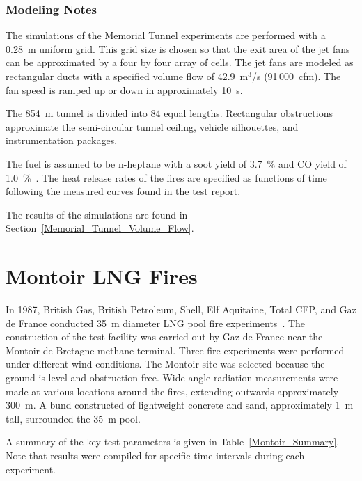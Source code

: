 \subsubsection{Modeling Notes}

The simulations of the Memorial Tunnel experiments are performed with a 0.28~m uniform grid. This grid size is chosen so that the exit area of the jet fans can be approximated by a four by four array of cells. The jet fans are modeled as rectangular ducts with a specified volume flow of 42.9~m$^3$/s (91\,000~cfm). The fan speed is ramped up or down in approximately 10~s.

The 854~m tunnel is divided into 84 equal lengths. Rectangular obstructions approximate the semi-circular tunnel ceiling, vehicle silhouettes, and instrumentation packages.

The fuel is assumed to be n-heptane with a soot yield of 3.7~\% and CO yield of 1.0~\%~\cite{SFPE:Tewarson}. The heat release rates of the fires are specified as functions of time following the measured curves found in the test report.

The results of the simulations are found in Section~\ref{Memorial_Tunnel_Volume_Flow}.


\section{Montoir LNG Fires}
\label{Montoir_LNG_Fires_Description}

In 1987, British Gas, British Petroleum, Shell, Elf Aquitaine, Total CFP, and Gaz de France conducted 35~m diameter LNG pool fire experiments~\cite{Nedelka:1990}. The construction of the test facility was carried out by Gaz de France near the Montoir de Bretagne methane terminal. Three fire experiments were performed under different wind conditions. The Montoir site was selected because the ground is level and obstruction free. Wide angle radiation measurements were made at various locations around the fires, extending outwards approximately 300~m. A bund constructed of lightweight concrete and sand, approximately 1~m tall, surrounded the 35~m pool. 

A summary of the key test parameters is given in Table~\ref{Montoir_Summary}. Note that results were compiled for specific time intervals during each experiment.

